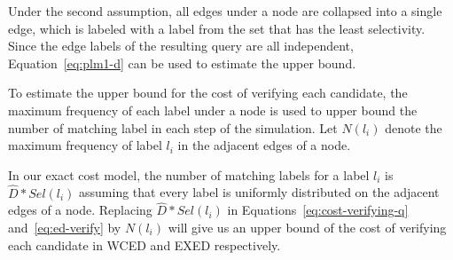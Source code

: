 \documentclass{sigmod}
\begin{document}
Under the second assumption, all edges under a node are collapsed into a single edge, which is labeled with a label from the set that has the least selectivity. Since the edge labels of the resulting query are all independent, Equation~\ref{eq:plm1-d} can be used to estimate the upper bound. 


To estimate the upper bound for the cost of verifying each candidate, the maximum frequency of each label under a node is used to upper bound the number of matching label in each step of the simulation. 
Let $N(l_i)$ denote the maximum frequency of label $l_i$ in the adjacent edges of a node. 

In our exact cost model, the number of matching labels for a  label $l_i$ is $\hat{D}*Sel(l_i)$ assuming that every label is uniformly distributed on the adjacent edges of a node. Replacing $\hat{D}*Sel(l_i)$ in Equations~\ref{eq:cost-verifying-q} and~\ref{eq:ed-verify} by $N(l_i)$ will give us an upper bound of the cost of verifying each candidate in WCED and EXED respectively. 

\end{document}
